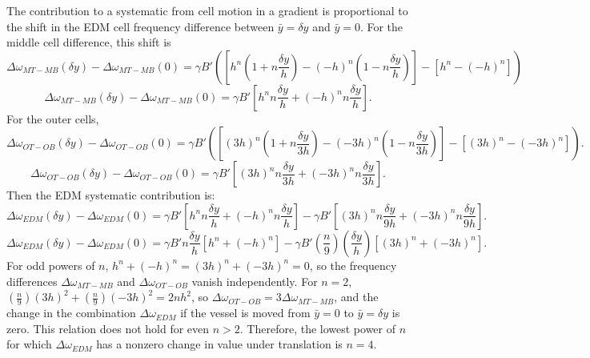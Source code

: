 \documentclass [10pt, twoside] {uwthesis}[2012/04/02]
\begin{document}
The contribution to a systematic from cell motion in a gradient is proportional to the shift in the EDM cell frequency difference between $\bar{y} = \delta y$ and $\bar{y} = 0$. For the middle cell difference, this shift is
\begin{equation}
\Delta\omega_{MT-MB}(\delta y) - \Delta\omega_{MT-MB}(0) = \gamma B'([h^n(1+n\frac{\delta y}{h}) - (-h)^n(1-n\frac{\delta y}{h})] - [h^n-(-h)^n])
\end{equation}
\begin{equation}
\Delta\omega_{MT-MB}(\delta y) - \Delta\omega_{MT-MB}(0) = \gamma B'[h^n n\frac{\delta y}{h} + (-h)^n n\frac{\delta y}{h}].
\end{equation}
For the outer cells,
\begin{equation}
\Delta\omega_{OT-OB}(\delta y) - \Delta\omega_{OT-OB}(0) = \gamma B'([(3h)^n(1+n\frac{\delta y}{3h}) - (-3h)^n(1-n\frac{\delta y}{3h})] - [(3h)^n-(-3h)^n]).
\end{equation}
\begin{equation}
\Delta\omega_{OT-OB}(\delta y) - \Delta\omega_{OT-OB}(0) = \gamma B'[(3h)^n n\frac{\delta y}{3h} + (-3h)^n n\frac{\delta y}{3h}].
\end{equation}
Then the EDM systematic contribution is:
\begin{equation}
\Delta\omega_{EDM}(\delta y) - \Delta\omega_{EDM}(0) = \gamma B'[h^n n\frac{\delta y}{h} + (-h)^n n\frac{\delta y}{h}] - \gamma B'[(3h)^n n\frac{\delta y}{9h} + (-3h)^n n\frac{\delta y}{9h}].
\end{equation}
\begin{equation}
\Delta\omega_{EDM}(\delta y) - \Delta\omega_{EDM}(0) = \gamma B' n\frac{\delta y}{h}[h^n + (-h)^n] - \gamma B'(\frac{n}{9})(\frac{\delta y}{h})[(3h)^n + (-3h)^n].
\end{equation}
For odd powers of $n$, $h^n + (-h)^n = (3h)^n + (-3h)^n = 0$, so the frequency differences $\Delta\omega_{MT-MB}$ and $\Delta\omega_{OT-OB}$ vanish independently. For $n=2$, $(\frac{n}{9})(3h)^2 + (\frac{n}{9})(-3h)^2 = 2nh^2$, so $\Delta\omega_{OT-OB} = 3\Delta\omega_{MT-MB}$, and the change in the combination $\Delta\omega_{EDM}$ if the vessel is moved from $\bar{y}=0$ to $\bar{y} = \delta y$ is zero. This relation does not hold for even $n>2$. Therefore, the lowest power of $n$ for which $\Delta\omega_{EDM}$ has a nonzero change in value under translation is $n=4$.
\end{document}
